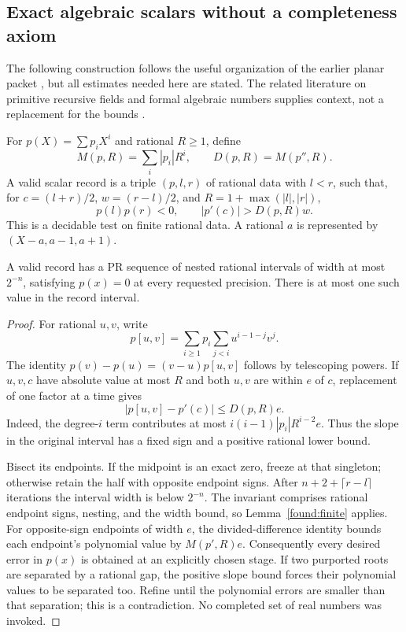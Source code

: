 \subsection{Exact algebraic scalars without a completeness axiom}
The following construction follows the useful organization of the earlier
planar packet \cite{planar}, but all estimates needed here are stated.
The related literature on primitive recursive fields and formal algebraic
numbers supplies context, not a replacement for the bounds
\cite{selivanov,cohen}.

For $p(X)=\sum p_iX^i$ and rational $R\ge1$, define
\[
 M(p,R)=\sum_i|p_i|R^i,\qquad D(p,R)=M(p'',R).
\]
A valid scalar record is a triple $(p,l,r)$ of rational data with $l<r$,
such that, for $c=(l+r)/2$, $w=(r-l)/2$, and
$R=1+\max(|l|,|r|)$,
\begin{equation}\label{eq:record}
 p(l)p(r)<0,\qquad |p'(c)|>D(p,R)w.
\end{equation}
This is a decidable test on finite rational data. A rational $a$ is
represented by $(X-a,a-1,a+1)$.

\begin{lemma}\label{found:reader}
A valid record has a PR sequence of nested rational intervals of width
at most $2^{-n}$, satisfying $p(x)=0$ at every requested precision.
There is at most one such value in the record interval.
\end{lemma}
\begin{proof}
For rational $u,v$, write
\[
 p[u,v]=\sum_{i\ge1}p_i\sum_{j<i}u^{i-1-j}v^j.
\]
The identity $p(v)-p(u)=(v-u)p[u,v]$ follows by telescoping powers.
If $u,v,c$ have absolute value at most $R$ and both $u,v$ are within
$e$ of $c$, replacement of one factor at a time gives
\begin{equation}\label{eq:divided}
 |p[u,v]-p'(c)|\le D(p,R)e.
\end{equation}
Indeed, the degree-$i$ term contributes at most
$i(i-1)|p_i|R^{i-2}e$. Thus the slope in the original interval has
a fixed sign and a positive rational lower bound.

Bisect its endpoints. If the midpoint is an exact zero, freeze at that
singleton; otherwise retain the half with opposite endpoint signs.
After $n+2+\lceil r-l\rceil$ iterations the interval width is below
$2^{-n}$. The invariant comprises rational endpoint signs, nesting,
and the width bound, so Lemma~\ref{found:finite} applies.
For opposite-sign endpoints of width $e$, the divided-difference identity
bounds each endpoint's polynomial value by $M(p',R)e$.
Consequently every desired error in $p(x)$ is obtained at an explicitly
chosen stage. If two purported roots are separated by a rational gap,
the positive slope bound forces their polynomial values to be separated
too. Refine until the polynomial errors are smaller than that separation;
this is a contradiction. No completed set of real numbers was invoked.
\end{proof}

